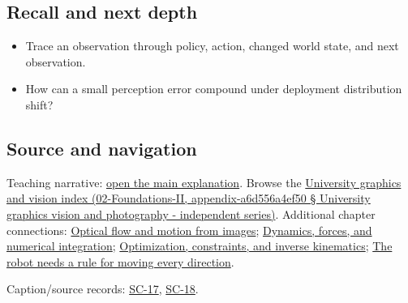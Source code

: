 \subsection{Recall and next depth}\label{recall-and-next-depth}

\begin{itemize}
\tightlist
\item
  Trace an observation through policy, action, changed world state, and next observation.
\item
  How can a small perception error compound under deployment distribution shift?
\end{itemize}

\subsection{Source and navigation}\label{source-and-navigation}

Teaching narrative: \href{Continuous\%20Notes/University\%20-\%20Worlds,\%20Images\%20and\%20Inference\%20-\%20Graphics,\%20Vision\%20and\%20Photography\#Robot\%20learning\%20closes\%20the\%20perception-action\%20loop}{open the main explanation}. Browse the \href{}{University graphics and vision index (02-Foundations-II, appendix-a6d556a4ef50 § University graphics vision and photography - independent series)}. Additional chapter connections: \href{Continuous\%20Notes/University\%20-\%20Worlds,\%20Images\%20and\%20Inference\%20-\%20Graphics,\%20Vision\%20and\%20Photography\#Optical\%20flow\%20and\%20motion\%20from\%20images}{Optical flow and motion from images}; \href{Continuous\%20Notes/University\%20-\%20Worlds,\%20Images\%20and\%20Inference\%20-\%20Graphics,\%20Vision\%20and\%20Photography\#Dynamics,\%20forces,\%20and\%20numerical\%20integration}{Dynamics, forces, and numerical integration}; \href{Continuous\%20Notes/University\%20-\%20Worlds,\%20Images\%20and\%20Inference\%20-\%20Graphics,\%20Vision\%20and\%20Photography\#Optimization,\%20constraints,\%20and\%20inverse\%20kinematics}{Optimization, constraints, and inverse kinematics}; \href{Continuous\%20Notes/Computing\%20Foundations\%20-\%20From\%20Bits\%20to\%20C++\%20and\%20Systems\%20APIs\#The\%20robot\%20needs\%20a\%20rule\%20for\%20moving\%20every\%20direction}{The robot needs a rule for moving every direction}.

Caption/source records: \href{Continuous\%20Notes/University\%20-\%20Worlds,\%20Images\%20and\%20Inference\%20-\%20Graphics,\%20Vision\%20and\%20Photography\#SC-17\%20-\%20Stanford\%20CS231N\%20Deep\%20Learning\%20for\%20Computer\%20Vision\%20Spring\%202025\%20Lecture\%2017:\%20Robot\%20Learning}{SC-17}, \href{Continuous\%20Notes/University\%20-\%20Worlds,\%20Images\%20and\%20Inference\%20-\%20Graphics,\%20Vision\%20and\%20Photography\#SC-18\%20-\%20Stanford\%20CS231N\%20Deep\%20Learning\%20for\%20Computer\%20Vision\%20Spring\%202025\%20Lecture\%2018:\%20Human-Centered\%20AI}{SC-18}.
